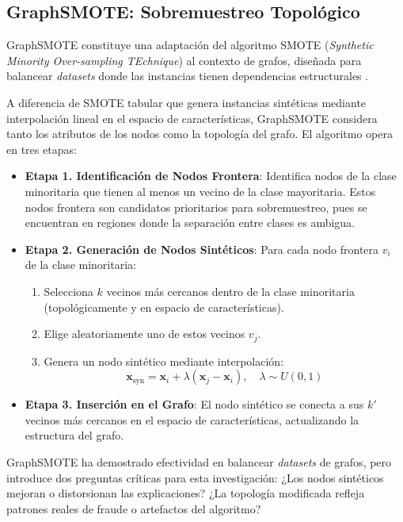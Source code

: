 \subsection{GraphSMOTE: Sobremuestreo Topológico}

GraphSMOTE constituye una adaptación del algoritmo SMOTE (\textit{Synthetic Minority Over-sampling TEchnique}) al contexto de grafos, diseñada para balancear \textit{datasets} donde las instancias tienen dependencias estructurales \cite{Zhao2021Graphsmote:Networks}.

A diferencia de SMOTE tabular que genera instancias sintéticas mediante interpolación lineal en el espacio de características, GraphSMOTE considera tanto los atributos de los nodos como la topología del grafo. El algoritmo opera en tres etapas:

\begin{itemize}
    \item \textbf{Etapa 1. Identificación de Nodos Frontera}: Identifica nodos de la clase minoritaria que tienen al menos un vecino de la clase mayoritaria. Estos nodos frontera son candidatos prioritarios para sobremuestreo, pues se encuentran en regiones donde la separación entre clases es ambigua.
    \item \textbf{Etapa 2. Generación de Nodos Sintéticos}: Para cada nodo frontera $v_i$ de la clase minoritaria:
    \begin{enumerate}
        \item Selecciona $k$ vecinos más cercanos dentro de la clase minoritaria (topológicamente y en espacio de características).
        \item Elige aleatoriamente uno de estos vecinos $v_j$.
        \item Genera un nodo sintético mediante interpolación:
        \[ \mathbf{x}_{\text{syn}} = \mathbf{x}_i + \lambda (\mathbf{x}_j - \mathbf{x}_i), \quad \lambda \sim U(0,1) \]
    \end{enumerate}
    \item \textbf{Etapa 3. Inserción en el Grafo}: El nodo sintético se conecta a sus $k'$ vecinos más cercanos en el espacio de características, actualizando la estructura del grafo.
\end{itemize}

GraphSMOTE ha demostrado efectividad en balancear \textit{datasets} de grafos, pero introduce dos preguntas críticas para esta investigación: ¿Los nodos sintéticos mejoran o distorsionan las explicaciones? ¿La topología modificada refleja patrones reales de fraude o artefactos del algoritmo?

